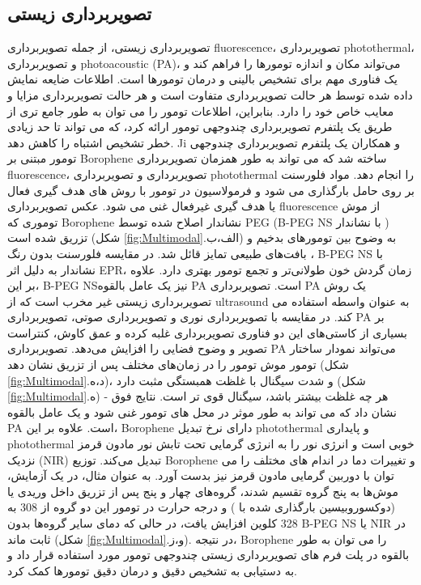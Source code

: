 \subsection{تصویربرداری زیستی}
تصویربرداری زیستی، از جمله تصویربرداری \gls{fluorescence}، \cite{gaoVivoCancerTargeting2004, medintzQuantumDotBioconjugates2005} تصویربرداری \gls{photothermal}، \cite{huangCancerCellImaging2006} و تصویربرداری \gls{photoacoustic} (\gls{PA})، \cite{beardBiomedicalPhotoacousticImaging2011} می‌تواند مکان و اندازه تومورها را فراهم کند و یک فناوری مهم برای تشخیص بالینی و درمان تومورها است. اطلاعات ضایعه نمایش داده شده توسط هر حالت تصویربرداری متفاوت است و هر حالت تصویربرداری مزایا و معایب خاص خود را دارد. بنابراین، اطلاعات تومور را می توان به طور جامع تری از طریق یک پلتفرم تصویربرداری چندوجهی تومور ارائه کرد، که می تواند تا حد زیادی خطر تشخیص اشتباه را کاهش دهد. \gls{Ji} و همکاران \cite{jiNovelTopDownSynthesis2018} یک پلتفرم تصویربرداری چندوجهی تومور مبتنی بر \gls{Borophene} ساخته شد که می تواند به طور همزمان تصویربرداری \gls{fluorescence}، تصویربرداری  و تصویربرداری \gls{photothermal} را انجام دهد. مواد فلورسنت بر روی حامل بارگذاری می شود و فرمولاسیون در تومور با روش های هدف گیری فعال یا هدف گیری غیرفعال غنی می شود. عکس تصویربرداری \gls{fluorescence} از موش توموری که \gls{Borophene} نشاندار  اصلاح شده توسط \gls{PEG} (\gls{B-PEG NS} با نشاندار ) تزریق شده است (شکل \ref{fig:Multimodal}.الف،ب) به وضوح بین تومورهای بدخیم و بافت‌های طبیعی تمایز قائل شد. در مقایسه  فلورسنت بدون رنگ ، \gls{B-PEG NS} با نشاندار  به دلیل اثر \gls{EPR}، زمان گردش خون طولانی‌تر و تجمع تومور بهتری دارد. علاوه بر این، \gls{B-PEG NS}نیز یک عامل بالقوه \gls{PA} است. تصویربرداری \gls{PA} یک روش تصویربرداری زیستی غیر مخرب است که از \gls{ultrasound} به عنوان واسطه استفاده می کند. در مقایسه با تصویربرداری نوری و تصویربرداری صوتی، تصویربرداری \gls{PA} بر بسیاری از کاستی‌های این دو فناوری تصویربرداری غلبه کرده و عمق کاوش، کنتراست تصویر و وضوح فضایی را افزایش می‌دهد. تصویربرداری \gls{PA} می‌تواند نمودار ساختار تومور موش تومور را در زمان‌های مختلف پس از تزریق  نشان دهد (شکل \ref{fig:Multimodal}.د،ه)، و شدت سیگنال  با غلظت  همبستگی مثبت دارد (شکل \ref{fig:Multimodal}.ه) - هر چه غلظت  بیشتر باشد، سیگنال قوی تر است. نتایج فوق نشان داد که  می تواند به طور موثر در محل های تومور غنی شود و یک عامل بالقوه \gls{PA} است. علاوه بر این، \gls{Borophene} دارای نرخ تبدیل \gls{photothermal} و پایداری \gls{photothermal} خوبی است و انرژی نور را به انرژی گرمایی تحت تابش نور مادون قرمز نزدیک (\gls{NIR}) تبدیل می‌کند. توزیع \gls{Borophene} و تغییرات دما در اندام های مختلف را می توان با دوربین گرمایی مادون قرمز نیز بدست آورد. به عنوان مثال، در یک آزمایش، موش‌ها به پنج گروه تقسیم شدند، گروه‌های چهار و پنج پس از تزریق داخل وریدی  یا  (دوکسوروبیسین بارگذاری شده با ) و درجه حرارت در تومور این دو گروه از 308 به 328 کلوین افزایش یافت، در حالی که دمای سایر گروه‌ها بدون \gls{B-PEG NS} یا \gls{NIR} در  ثابت ماند (شکل \ref{fig:Multimodal}.و،ز). در نتیجه، \gls{Borophene} را می توان به طور بالقوه در پلت فرم های تصویربرداری زیستی چندوجهی تومور مورد استفاده قرار داد و به دستیابی به تشخیص دقیق و درمان دقیق تومورها کمک کرد.


